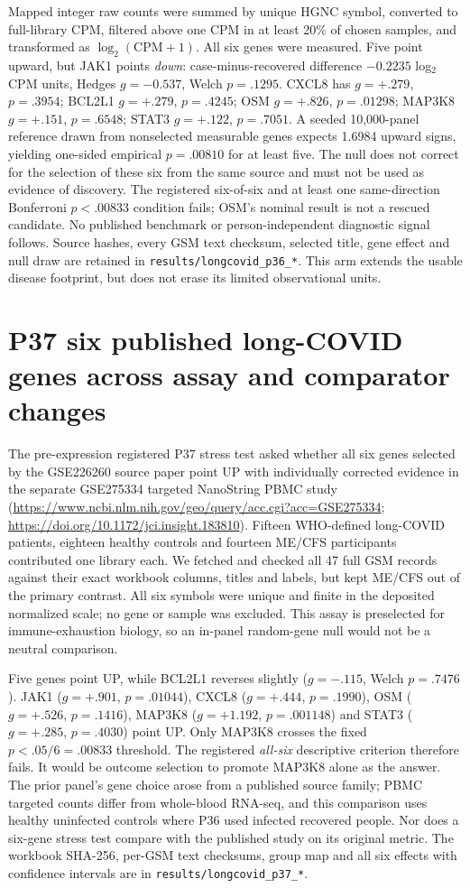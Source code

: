 \documentclass[11pt,a4paper]{article}
\begin{document}
Mapped integer raw counts were summed by unique HGNC symbol, converted to full-library CPM, filtered above one CPM in at least 20\% of chosen samples, and transformed as $\log_2(\mathrm{CPM}+1)$. All six genes were measured. Five point upward, but JAK1 points \emph{down}: case-minus-recovered difference $-0.2235$ log$_2$CPM units, Hedges $g=-0.537$, Welch $p=.1295$. CXCL8 has $g=+.279$, $p=.3954$; BCL2L1 $g=+.279$, $p=.4245$; OSM $g=+.826$, $p=.01298$; MAP3K8 $g=+.151$, $p=.6548$; STAT3 $g=+.122$, $p=.7051$. A seeded 10,000-panel reference drawn from nonselected measurable genes expects 1.6984 upward signs, yielding one-sided empirical $p=.00810$ for at least five. The null does not correct for the selection of these six from the same source and must not be used as evidence of discovery. The registered six-of-six and at least one same-direction Bonferroni $p<.00833$ condition fails; OSM's nominal result is not a rescued candidate. No published benchmark or person-independent diagnostic signal follows. Source hashes, every GSM text checksum, selected title, gene effect and null draw are retained in \texttt{results/longcovid\_p36\_*}. This arm extends the usable disease footprint, but does not erase its limited observational units.

\section{P37 six published long-COVID genes across assay and comparator changes}
The pre-expression registered P37 stress test asked whether all six genes selected by the GSE226260 source paper point UP with individually corrected evidence in the separate GSE275334 targeted NanoString PBMC study (\url{https://www.ncbi.nlm.nih.gov/geo/query/acc.cgi?acc=GSE275334}; \url{https://doi.org/10.1172/jci.insight.183810}). Fifteen WHO-defined long-COVID patients, eighteen healthy controls and fourteen ME/CFS participants contributed one library each. We fetched and checked all 47 full GSM records against their exact workbook columns, titles and labels, but kept ME/CFS out of the primary contrast. All six symbols were unique and finite in the deposited normalized scale; no gene or sample was excluded. This assay is preselected for immune-exhaustion biology, so an in-panel random-gene null would not be a neutral comparison.

Five genes point UP, while BCL2L1 reverses slightly ($g=-.115$, Welch $p=.7476$). JAK1 ($g=+.901$, $p=.01044$), CXCL8 ($g=+.444$, $p=.1990$), OSM ($g=+.526$, $p=.1416$), MAP3K8 ($g=+1.192$, $p=.001148$) and STAT3 ($g=+.285$, $p=.4030$) point UP. Only MAP3K8 crosses the fixed $p<.05/6=.00833$ threshold. The registered \emph{all-six} descriptive criterion therefore fails. It would be outcome selection to promote MAP3K8 alone as the answer. The prior panel's gene choice arose from a published source family; PBMC targeted counts differ from whole-blood RNA-seq, and this comparison uses healthy uninfected controls where P36 used infected recovered people. Nor does a six-gene stress test compare with the published study on its original metric. The workbook SHA-256, per-GSM text checksums, group map and all six effects with confidence intervals are in \texttt{results/longcovid\_p37\_*}.
\end{document}
